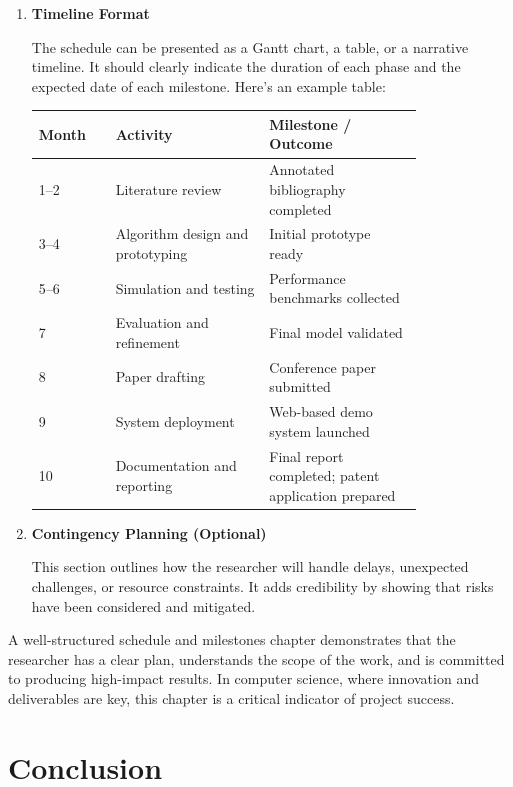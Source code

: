 \documentclass[PCOM,Proposal,Review]{mpThesis}
\newcommand{\Hd}[1]{{\color{SteelBlue}\bf#1}}
\begin{document}
\begin{MainMatter}
\begin{Remark}
\begin{enumerate}
\item \Hd{Timeline Format}

The schedule can be presented as a Gantt chart, a table, or a narrative timeline.
It should clearly indicate the duration of each phase and the expected date of each milestone. Here's an example table:
\begin{center}
\small
\begin{tabular}{|l|>{\raggedright\arraybackslash}p{0.4\linewidth}|>{\raggedright\arraybackslash}p{0.4\linewidth}|}
\hline
\textbf{Month} & \textbf{Activity} & \textbf{Milestone / Outcome} \\
\hline
1–2 & Literature review & Annotated bibliography completed \\
\hline
3–4 & Algorithm design and prototyping & Initial prototype ready \\
\hline
5–6 & Simulation and testing & Performance benchmarks collected \\
\hline
7 & Evaluation and refinement & Final model validated \\
\hline
8 & Paper drafting & Conference paper submitted \\
\hline
9 & System deployment & Web-based demo system launched \\
\hline
10 & Documentation and reporting & Final report completed; patent application prepared \\
\hline
\end{tabular}
\end{center}

\item \Hd{Contingency Planning (Optional)}

This section outlines how the researcher will handle delays, unexpected challenges, or resource constraints.
It adds credibility by showing that risks have been considered and mitigated.
\end{enumerate}
A well-structured schedule and milestones chapter demonstrates that the researcher has
a clear plan, understands the scope of the work, and is committed to producing high-impact results.
In computer science, where innovation and deliverables are key, this chapter is a critical indicator of project success.
\end{Remark}

\chapter{Conclusion}
\label{ch:conclusion}
\minitoc


\end{MainMatter}
\end{document}

